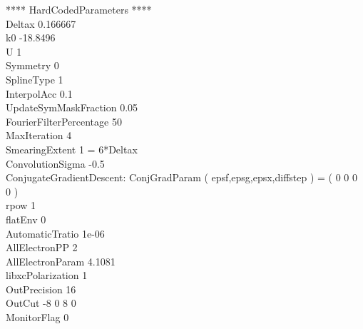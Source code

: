 \documentclass[a4paper,10pt]{article}
\begin{document}
**** HardCodedParameters ****\\Deltax 0.166667\\k0 -18.8496\\U 1\\Symmetry 0\\SplineType 1\\InterpolAcc 0.1\\UpdateSymMaskFraction 0.05\\FourierFilterPercentage 50\\MaxIteration 4\\SmearingExtent 1 = 6*Deltax\\ConvolutionSigma -0.5\\ConjugateGradientDescent: ConjGradParam ( epsf,epsg,epsx,diffstep ) = ( 0 0 0 0 )\\rpow 1\\flatEnv 0\\AutomaticTratio 1e-06\\AllElectronPP 2\\AllElectronParam 4.1081\\libxcPolarization 1\\OutPrecision 16\\OutCut -8 0 8 0 \\MonitorFlag 0\\\newpage 
\end{document}

